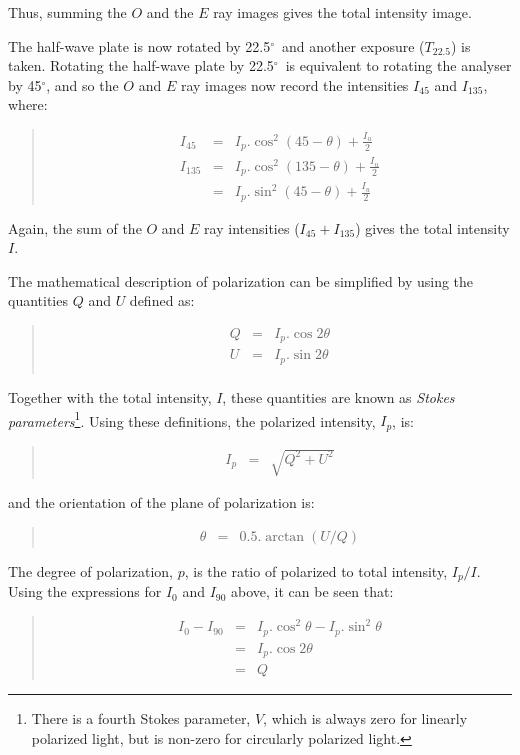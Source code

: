 \documentclass[twoside,11pt]{starlink}
\newenvironment{myquote}{\begin{quote}\begin{small}}{\end{small}\end{quote}}
\providecommand{\dgs}{\hbox{$^\circ$}}
\begin{document}
Thus, summing the $O$ and the $E$ ray images gives the total intensity
image.

The half-wave plate is now rotated by 22.5\dgs\ and another exposure
($T_{22.5}$) is taken. Rotating the half-wave plate by 22.5\dgs\ is
equivalent to rotating the analyser by 45\dgs, and so the $O$ and $E$ ray
images now record the intensities $I_{45}$ and $I_{135}$, where:
\begin{myquote}
\begin{eqnarray*}
  I_{45} & = & I_{p}.\cos^{2}(45 - \theta) + \frac{I_{u}}{2} \\
 I_{135} & = & I_{p}.\cos^{2}(135 - \theta) + \frac{I_{u}}{2} \\
         & = & I_{p}.\sin^{2}(45 - \theta) + \frac{I_{u}}{2}
\end{eqnarray*}
\end{myquote}

Again, the sum of the $O$ and $E$ ray intensities ($I_{45}+I_{135}$)
gives the total intensity $I$.

The mathematical description of polarization can be simplified by using
the quantities $Q$ and $U$ defined as:
\begin{myquote}
\begin{eqnarray*}
  Q & = & I_{p}.\cos 2\theta \\
  U & = & I_{p}.\sin 2\theta \\
\end{eqnarray*}
\end{myquote}

Together with the total intensity, $I$, these quantities are known as
\emph{Stokes parameters}\footnote{There is a fourth Stokes parameter, $V$, which is
always zero for linearly polarized light, but is non-zero for circularly
polarized light.}. Using these definitions, the polarized intensity, $I_{p}$,
is:
\begin{myquote}
\begin{eqnarray*}
  I_{p} & = & \sqrt{ Q^{2} + U^{2} }
\end{eqnarray*}
\end{myquote}

and the orientation of the plane of polarization is:
\begin{myquote}
\begin{eqnarray*}
  \theta & = & 0.5.\arctan (U/Q)
\end{eqnarray*}
\end{myquote}

The degree of polarization, $p$, is the ratio of polarized to total
intensity, $I_{p}/I$. Using the expressions for $I_{0}$ and $I_{90}$
above, it can be seen that:
\begin{myquote}
\begin{eqnarray*}
  I_{0} - I_{90} & = & I_{p}.\cos^{2}\theta - I_{p}.\sin^{2}\theta \\
                 & = & I_{p}.\cos 2\theta \\
                 & = & Q
\end{eqnarray*}
\end{myquote}
\end{document}
